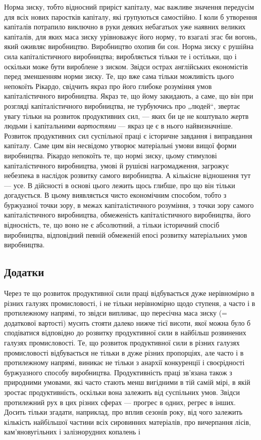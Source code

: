 Норма зиску, тобто відносний приріст капіталу, має важливе
значення передусім для всіх нових паростків капіталу, які групуються
самостійно. І коли б утворення капіталів потрапило
виключно в руки деяких небагатьох уже наявних великих
капіталів, для яких маса зиску урівноважує його норму, то
взагалі згас би вогонь, який оживляє виробництво. Виробництво
охопив би сон. Норма зиску є рушійна сила капіталістичного
виробництва; виробляється тільки те і остільки, що і оскільки
може бути вироблене з зиском. Звідси острах англійських економістів
перед зменшенням норми зиску. Те, що вже сама тільки
можливість цього непокоїть Рікардо, свідчить якраз про його
глибоке розуміння умов капіталістичного виробництва. Якраз те,
що йому закидають, а саме, що він при розгляді капіталістичного
виробництва, не турбуючись про „людей“, звертає увагу
тільки на розвиток продуктивних сил, — яких би це не коштувало
жертв людьми і капітальними \emph{вартостями} — якраз це є
в нього найвизначніше. Розвиток продуктивних сил суспільної
праці є історичне завдання і виправдання капіталу. Саме цим він
несвідомо утворює матеріальні умови вищої форми виробництва.
Рікардо непокоїть те, що нормі зиску, цьому стимулові капіталістичного
виробництва, умові й рушієві нагромадження, загрожує
небезпека в наслідок розвитку самого виробництва. А кількісне
відношення тут — усе. В дійсності в основі цього лежить щось
глибше, про що він тільки догадується. В цьому виявляється
чисто економічним способом, тобто з буржуазної точки зору,
в межах капіталістичного розуміння, з точки зору самого капіталістичного
виробництва, обмеженість капіталістичного виробництва,
його відносність, те, що воно не є абсолютний, а тільки
історичний спосіб виробництва, відповідний певній обмеженій
епосі розвитку матеріальних умов виробництва.

\subsection{Додатки}

Через те що розвиток продуктивної сили праці відбувається
дуже нерівномірно в різних галузях промисловості, і не тільки
нерівномірно щодо ступеня, а часто і в протилежному напрямі,
то звідси випливає, що пересічна маса зиску (= додаткової
вартості) мусить стояти далеко нижче тієї висоти, якої можна
було б сподіватися відповідно до розвитку продуктивної сили
в найбільш розвинених галузях промисловості. Те, що розвиток
продуктивної сили в різних галузях промисловості відбувається
не тільки в дуже різних пропорціях, але часто і в протилежному
напрямі, виникає не тільки з анархії конкуренції і своєрідності
буржуазного способу виробництва. Продуктивність праці
зв’язана також з природними умовами, які часто стають менш
вигідними в тій самій мірі, в якій зростає продуктивність, оскільки
вона залежить від суспільних умов. Звідси протилежний рух
в цих різних сферах — прогрес в одних, регрес в інших. Досить
тільки згадати, наприклад, про вплив сезонів року, від чого
залежить кількість найбільшої частини всіх сировинних матеріалів,
про вичерпання лісів, кам’яновугільних і залізнорудних
копалень і~

